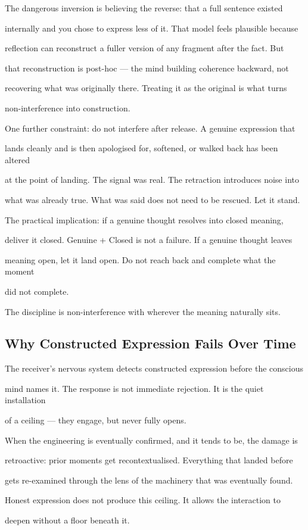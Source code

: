 The dangerous inversion is believing the reverse: that a full sentence existed

internally and you chose to express less of it. That model feels plausible because

reflection can reconstruct a fuller version of any fragment after the fact. But

that reconstruction is post-hoc --- the mind building coherence backward, not

recovering what was originally there. Treating it as the original is what turns

non-interference into construction.

\vspace{0.5em}

One further constraint: do not interfere after release. A genuine expression that

lands cleanly and is then apologised for, softened, or walked back has been altered

at the point of landing. The signal was real. The retraction introduces noise into

what was already true. What was said does not need to be rescued. Let it stand.

\vspace{0.5em}

The practical implication: if a genuine thought resolves into closed meaning,

deliver it closed. Genuine + Closed is not a failure. If a genuine thought leaves

meaning open, let it land open. Do not reach back and complete what the moment

did not complete.

The discipline is non-interference with wherever the meaning naturally sits.

\subsection{Why Constructed Expression Fails Over Time}

The receiver's nervous system detects constructed expression before the conscious

mind names it. The response is not immediate rejection. It is the quiet installation

of a ceiling --- they engage, but never fully opens.

When the engineering is eventually confirmed, and it tends to be, the damage is

retroactive: prior moments get recontextualised. Everything that landed before

gets re-examined through the lens of the machinery that was eventually found.

Honest expression does not produce this ceiling. It allows the interaction to

deepen without a floor beneath it.
